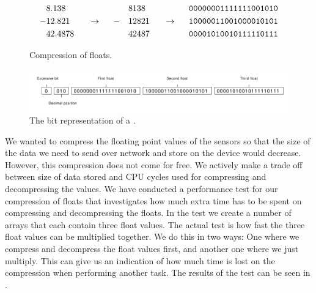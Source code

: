 \begin{figure}[!htbp]
    \begin{alignat*}{6}
       &8.138   &&                   &&   && 8138  &&                   && \text{\texttt{00000001111111001010}} \\
      -&12.821  && ~~ \rightarrow ~~ && - && 12821 && ~~ \rightarrow ~~ && \text{\texttt{10000011001000010101}} \\
       &42.4878 &&                   &&   && 42487 &&                   && \text{\texttt{00001010010111110111}} 
    \end{alignat*}
    \caption{Compression of floats.}
    \label{fig:float_triple_convert}
\end{figure}
\FloatBarrier

\begin{figure}[!htbp]
    \centering
    \includegraphics[width=\textwidth]{graphic/gathering_sensor_data/float_triple_bit}
    \caption{The bit representation of a .}
    \label{fig:float_triple_bit}
\end{figure}
\FloatBarrier

We wanted to compress the floating point values of the sensors so that the size of the data we need to send over network and store on the device would decrease. However, this compression does not come for free. We actively make a trade off between size of data stored and CPU cycles used for compressing and decompressing the values. We have conducted a performance test for our compression of floats that investigates how much extra time has to be spent on compressing and decompressing the floats. In the test we create a number of arrays that each contain three float values. The actual test is how fast the three float values can be multiplied together. We do this in two ways: One where we compress and decompress the float values first, and another one where we just multiply. This can give us an indication of how much time is lost on the compression when performing another task. The results of the test can be seen in .

